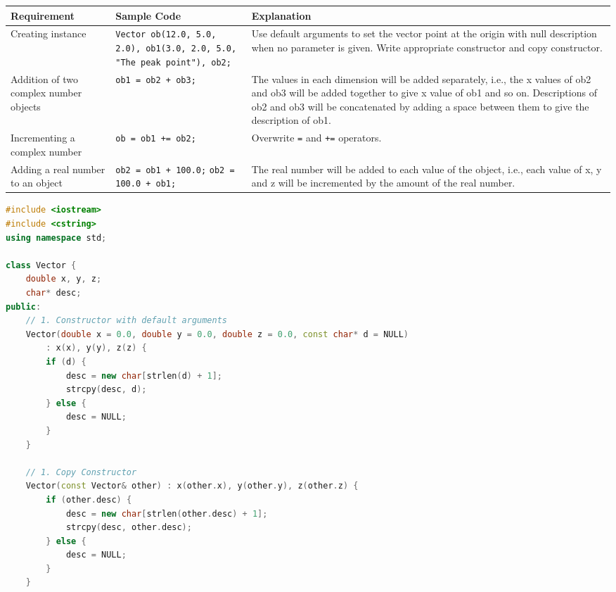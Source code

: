 \documentclass[12pt,a3paper]{article}
\begin{document}
\begin{enumerate}
\begin{center}
\renewcommand{\arraystretch}{1.3}
\begin{tabular}{|p{}|p{}|p{}|}
\hline
Requirement & Sample Code & Explanation \\
\hline
Creating instance & \texttt{Vector ob(12.0, 5.0, 2.0), ob1(3.0, 2.0, 5.0, "The peak point"), ob2;} & Use default arguments to set the vector point at the origin with null description when no parameter is given. Write appropriate constructor and copy constructor. \\
\hline
Addition of two complex number objects & \texttt{ob1 = ob2 + ob3;} & The values in each dimension will be added separately, i.e., the x values of ob2 and ob3 will be added together to give x value of ob1 and so on. Descriptions of ob2 and ob3 will be concatenated by adding a space between them to give the description of ob1. \\
\hline
Incrementing a complex number & \texttt{ob = ob1 += ob2;} & Overwrite \texttt{=} and \texttt{+=} operators. \\
\hline
Adding a real number to an object & \texttt{ob2 = ob1 + 100.0;} \newline \texttt{ob2 = 100.0 + ob1;} & The real number will be added to each value of the object, i.e., each value of x, y and z will be incremented by the amount of the real number. \\
\hline
\end{tabular}
\end{center}

\begin{tcolorbox}[enhanced,breakable,ansbox,
  colback=cF!4,colframe=cF,boxrule=0.8pt,arc=5pt,
  title={\textbf{Answer --- Vector Class: Constructors, Overloaded Operators (+, +=, =)}},
  fonttitle=\bfseries\color{white},colbacktitle=cF]
\begin{lstlisting}[language=C++]
#include <iostream>
#include <cstring>
using namespace std;

class Vector {
    double x, y, z;
    char* desc;
public:
    // 1. Constructor with default arguments
    Vector(double x = 0.0, double y = 0.0, double z = 0.0, const char* d = NULL) 
        : x(x), y(y), z(z) {
        if (d) {
            desc = new char[strlen(d) + 1];
            strcpy(desc, d);
        } else {
            desc = NULL;
        }
    }

    // 1. Copy Constructor
    Vector(const Vector& other) : x(other.x), y(other.y), z(other.z) {
        if (other.desc) {
            desc = new char[strlen(other.desc) + 1];
            strcpy(desc, other.desc);
        } else {
            desc = NULL;
        }
    }


\end{lstlisting}
\end{tcolorbox}
\end{enumerate}
\end{document}
